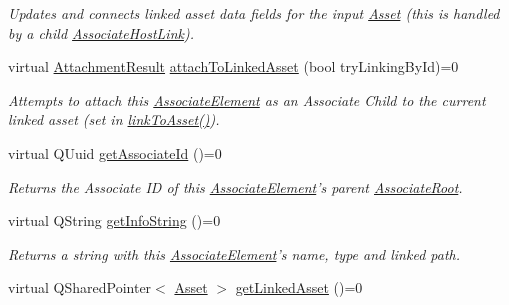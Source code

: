 \begin{DoxyCompactItemize}
\begin{DoxyCompactList}\small\item\em Updates and connects linked asset data fields for the input \hyperlink{class_picto_1_1_asset}{Asset} (this is handled by a child \hyperlink{class_picto_1_1_associate_host_link}{Associate\-Host\-Link}). \end{DoxyCompactList}\item 
virtual \hyperlink{class_picto_1_1_associate_element_a4748629e8da6dae94a635082c340f512}{Attachment\-Result} \hyperlink{class_picto_1_1_associate_element_a475c2d61770f6bdb3d4f014a12ad370d}{attach\-To\-Linked\-Asset} (bool try\-Linking\-By\-Id)=0
\begin{DoxyCompactList}\small\item\em Attempts to attach this \hyperlink{class_picto_1_1_associate_element}{Associate\-Element} as an Associate Child to the current linked asset (set in \hyperlink{class_picto_1_1_associate_element_a8ef5f864d782c1d07772cbb6d585dd11}{link\-To\-Asset()}). \end{DoxyCompactList}\item 
\hypertarget{class_picto_1_1_associate_element_a0877bf5254cb6b54b2f77e148af46055}{virtual Q\-Uuid \hyperlink{class_picto_1_1_associate_element_a0877bf5254cb6b54b2f77e148af46055}{get\-Associate\-Id} ()=0}\label{class_picto_1_1_associate_element_a0877bf5254cb6b54b2f77e148af46055}

\begin{DoxyCompactList}\small\item\em Returns the Associate I\-D of this \hyperlink{class_picto_1_1_associate_element}{Associate\-Element}'s parent \hyperlink{class_picto_1_1_associate_root}{Associate\-Root}. \end{DoxyCompactList}\item 
\hypertarget{class_picto_1_1_associate_element_a56bf7be74c1f07b6d003df169ad89518}{virtual Q\-String \hyperlink{class_picto_1_1_associate_element_a56bf7be74c1f07b6d003df169ad89518}{get\-Info\-String} ()=0}\label{class_picto_1_1_associate_element_a56bf7be74c1f07b6d003df169ad89518}

\begin{DoxyCompactList}\small\item\em Returns a string with this \hyperlink{class_picto_1_1_associate_element}{Associate\-Element}'s name, type and linked path. \end{DoxyCompactList}\item 
\hypertarget{class_picto_1_1_associate_element_a697601202b95b1a80d20feee238fd461}{virtual Q\-Shared\-Pointer$<$ \hyperlink{class_picto_1_1_asset}{Asset} $>$ \hyperlink{class_picto_1_1_associate_element_a697601202b95b1a80d20feee238fd461}{get\-Linked\-Asset} ()=0}\label{class_picto_1_1_associate_element_a697601202b95b1a80d20feee238fd461}


\end{DoxyCompactItemize}
